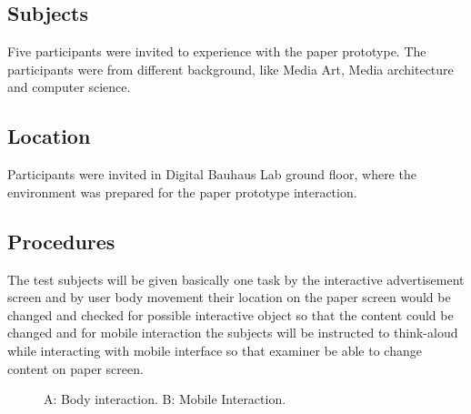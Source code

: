 \subsection{Subjects}
Five participants were invited to experience with the paper prototype.
The participants were from different background, like Media Art, Media architecture and computer science.

\subsection{Location}
Participants were invited in Digital Bauhaus Lab ground floor, where the environment was prepared for the paper prototype interaction.


\subsection{Procedures}
The test subjects will be given basically one task by the interactive advertisement screen and by user body movement their location on the paper screen would be changed and checked for possible interactive object so that the content could be changed and for mobile interaction the subjects will be instructed to think-aloud while interacting with mobile interface so that examiner be able to change content on paper screen.

\begin{figure}[H]
    \centering
    \hfill
    \caption{A: Body interaction.  B: Mobile Interaction. }%
    \label{fig:Interactive_prototype}%
\end{figure}



